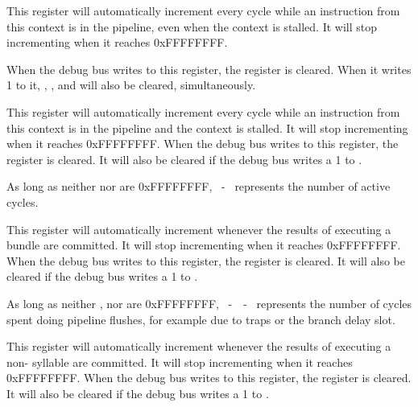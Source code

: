 
This register will automatically increment every cycle while an instruction from
this context is in the pipeline, even when the context is stalled. It will stop
incrementing when it reaches 0xFFFFFFFF.

When the debug bus writes to this register, the register is cleared. When it
writes 1 to it, , ,  and  will also be
cleared, simultaneously.

\debugCanWrite{}


This register will automatically increment every cycle while an instruction from
this context is in the pipeline and the context is stalled. It will stop
incrementing when it reaches 0xFFFFFFFF. When the debug bus writes to this 
register, the register is cleared. It will also be cleared if the debug bus
writes a 1 to .

As long as neither  nor  are 0xFFFFFFFF,
~-~ represents the number of active cycles.

\debugCanWrite{}


This register will automatically increment whenever the results of executing a
bundle are committed. It will stop incrementing when it reaches 0xFFFFFFFF. When
the debug bus writes to this register, the register is cleared. It will also be 
cleared if the debug bus writes a 1 to .

As long as neither ,  nor  are 0xFFFFFFFF,
~-~~-~ represents the number of cycles spent
doing pipeline flushes, for example due to traps or the branch delay slot.

\debugCanWrite{}


This register will automatically increment whenever the results of executing a
non- syllable are committed. It will stop incrementing when it reaches
0xFFFFFFFF. When the debug bus writes to this register, the register is cleared.
It will also be cleared if the debug bus writes a 1 to .

